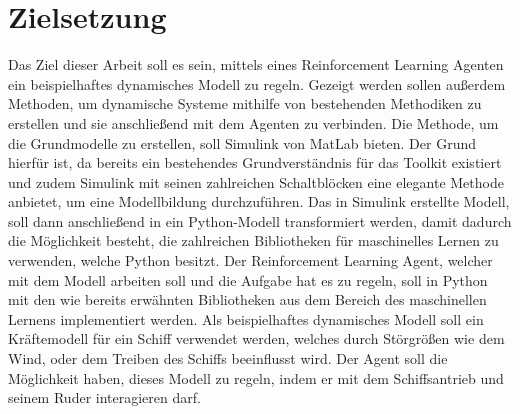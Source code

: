 \documentclass[]{iat}
\begin{document}
\section{Zielsetzung} \label{sec:zielsetzung}
Das Ziel dieser Arbeit soll es sein, mittels eines Reinforcement Learning Agenten ein beispielhaftes dynamisches Modell zu regeln. Gezeigt werden sollen außerdem Methoden, um dynamische Systeme mithilfe von bestehenden Methodiken zu erstellen und sie anschließend mit dem Agenten zu verbinden. Die Methode, um die Grundmodelle zu erstellen, soll Simulink von MatLab bieten. Der Grund hierfür ist, da bereits ein bestehendes Grundverständnis für das Toolkit existiert und zudem Simulink mit seinen zahlreichen Schaltblöcken eine elegante Methode anbietet, um eine Modellbildung durchzuführen. Das in Simulink erstellte Modell, soll dann anschließend in ein Python-Modell transformiert werden, damit dadurch die Möglichkeit besteht, die zahlreichen Bibliotheken für maschinelles Lernen zu verwenden, welche Python besitzt. Der Reinforcement Learning Agent, welcher mit dem Modell arbeiten soll und die Aufgabe hat es zu regeln, soll in Python mit den wie bereits erwähnten Bibliotheken aus dem Bereich des maschinellen Lernens implementiert werden. Als beispielhaftes dynamisches Modell soll ein Kräftemodell für ein Schiff verwendet werden, welches durch Störgrößen wie dem Wind, oder dem Treiben des Schiffs beeinflusst wird. Der Agent soll die Möglichkeit haben, dieses Modell zu regeln, indem er mit dem Schiffsantrieb und seinem Ruder interagieren darf.
\end{document}
